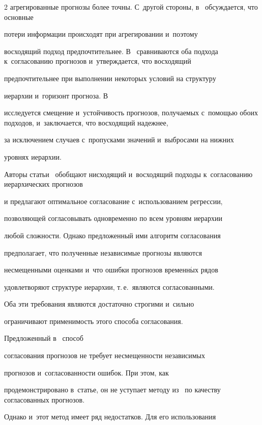 \begin{multicols}{2}
агрегированные прогнозы более точны. С~другой стороны, в~\cite{orcutt1968data, edwards1969should} обсуждается, что основные

потери информации происходят при агрегировании и~поэтому

восходящий подход предпочтительнее. В~\cite{shlifer1979aggregation} сравниваются оба подхода к~согласованию прогнозов и~утверждается, что восходящий

предпочтительнее при выполнении некоторых условий на структуру

иерархии и~горизонт прогноза. В~\cite{schwarzkopf1988top}

исследуется смещение и~устойчивость прогнозов, получаемых с~помощью обоих подходов, и~заключается, что восходящий  надежнее,

за исключением случаев с~пропусками значений и~выбросами на нижних

уровнях иерархии.



Авторы статьи~\cite{hyndman2011optimal} обобщают нисходящий и~восходящий подходы к~согласованию иерархических прогнозов

и предлагают оптимальное согласование с~использованием регрессии,

позволяющей согласовывать одновременно по всем уровням иерархии

любой сложности. Однако предложенный ими алгоритм согласования

предполагает, что полученные независимые прогнозы являются

несмещенными оценками и~что ошибки прогнозов временн$\acute{\mbox{ы}}$х рядов

удовлетворяют структуре иерархии, т.\,е.\ являются согласованными.

Оба эти требования являются достаточно строгими и~сильно

ограничивают применимость этого способа согласования.



Предложенный в~\cite{stenina2014reconciliation} способ

согласования прогнозов не требует несмещенности независимых

прогнозов и~согласованности ошибок. При этом, как

продемонстрировано в~статье, он не уступает методу из~\cite{hyndman2011optimal} по качеству согласованных прогнозов.

Однако и~этот метод имеет ряд недостатков. Для его использования


\end{multicols}
